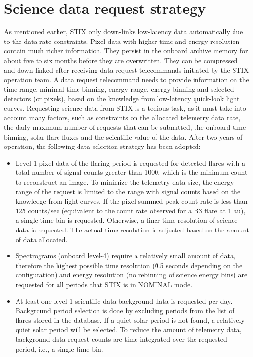 \documentclass[referee]{aa} %
\begin{document}
\section{Science data request strategy}
As mentioned earlier, STIX only down-links low-latency data 
automatically due to the data rate constraints.  
Pixel data with higher time and energy resolution contain much richer information. 
They persist in the onboard archive memory for about five to six months 
before they are overwritten.
They can be compressed and 
down-linked after receiving data request telecommands initiated by the STIX operation team. 
A data request telecommand needs to provide information on the
time range, minimal time binning, energy range, energy binning  and selected detectors (or pixels), based on 
the knowledge from low-latency quick-look light curves.
Requesting science data from STIX is a tedious task, as it must take
into account many factors, such as constraints on the  allocated telemetry data rate, 
the daily maximum number of requests that can be submitted,  
the onboard time binning, 
solar flare fluxes and the scientific value of the data. 
After two years of operation, the following data selection strategy has been adopted: 
\begin{itemize}
  \item 
  Level-1 pixel data 
  of the flaring period is requested for detected flares with a total number of signal counts  greater than 1000, 
  which is the minimum count to reconstruct an image.  
  To minimize the telemetry data size, 
  the energy range of the request is limited to the range with signal counts based on the 
  knowledge from light curves. 
  If the pixel-summed peak count rate is less than 125 counts/sec
  (equivalent to the count rate observed for a B3 flare at 1 au), 
  a single time-bin is requested. Otherwise, a finer time resolution of science data is requested.
  The actual time resolution is adjusted based on the amount of data allocated.
 \item Spectrograms (onboard level-4) require a relatively small amount of data, therefore
  the highest possible time resolution (\~ 0.5 seconds depending on the configuration)
   and energy resolution  (no rebinning of science energy bins) are requested for all periods that STIX is in NOMINAL mode. 
\item At least one level 1 scientific data background data is requested per day. 
Background period selection is done by excluding periods from the list of flares stored in the database. 
If a quiet solar period is not found, a relatively quiet solar period will be selected. 
To reduce the amount of telemetry data, 
background data request counts are time-integrated over the requested period, i.e., a single time-bin.
\end{itemize}
\end{document}
